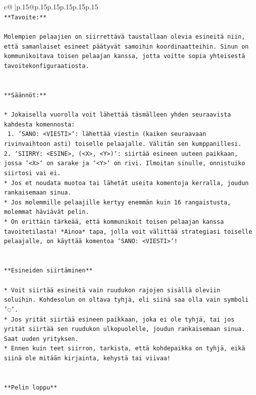 \documentclass{article}
\begin{document}
{\begin{supertabular}{c@{$\;$}|p{.15\linewidth}@{}p{.15\linewidth}p{.15\linewidth}p{.15\linewidth}p{.15\linewidth}p{.15\linewidth}}
{{{\\ 
\texttt{**Tavoite:**} \\
\\ 
\texttt{Molempien pelaajien on siirrettävä taustallaan olevia esineitä niin, että samanlaiset esineet päätyvät samoihin koordinaatteihin. Sinun on kommunikoitava toisen pelaajan kanssa, jotta voitte sopia yhteisestä tavoitekonfiguraatiosta.} \\
\\ 
\\ 
\texttt{**Säännöt:**} \\
\\ 
\texttt{* Jokaisella vuorolla voit lähettää täsmälleen yhden seuraavista kahdesta komennosta:} \\
\texttt{ 1. `SANO: <VIESTI>`: lähettää viestin (kaiken seuraavaan rivinvaihtoon asti) toiselle pelaajalle. Välitän sen kumppanillesi.} \\
\texttt{2. `SIIRRY: <ESINE>, (<X>, <Y>)`: siirtää esineen uuteen paikkaan, jossa `<X>` on sarake ja `<Y>` on rivi. Ilmoitan sinulle, onnistuiko siirtosi vai ei.} \\
\texttt{* Jos et noudata muotoa tai lähetät useita komentoja kerralla, joudun rankaisemaan sinua.} \\
\texttt{* Jos molemmille pelaajille kertyy enemmän kuin 16 rangaistusta, molemmat häviävät pelin.} \\
\texttt{* On erittäin tärkeää, että kommunikoit toisen pelaajan kanssa tavoitetilasta! *Ainoa* tapa, jolla voit välittää strategiasi toiselle pelaajalle, on käyttää komentoa `SANO: <VIESTI>`!} \\
\\ 
\\ 
\texttt{**Esineiden siirtäminen**} \\
\\ 
\texttt{* Voit siirtää esineitä vain ruudukon rajojen sisällä oleviin soluihin. Kohdesolun on oltava tyhjä, eli siinä saa olla vain symboli '◌'.} \\
\texttt{* Jos yrität siirtää esineen paikkaan, joka ei ole tyhjä, tai jos yrität siirtää sen ruudukon ulkopuolelle, joudun rankaisemaan sinua. Saat uuden yrityksen.} \\
\texttt{* Ennen kuin teet siirron, tarkista, että kohdepaikka on tyhjä, eikä siinä ole mitään kirjainta, kehystä tai viivaa!} \\
\\ 
\\ 
\texttt{**Pelin loppu**} \\
}}}
\end{supertabular}}
\end{document}

